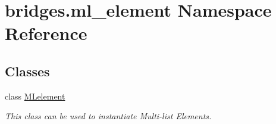 \hypertarget{namespacebridges_1_1ml__element}{}\section{bridges.\+ml\+\_\+element Namespace Reference}
\label{namespacebridges_1_1ml__element}
\subsection*{Classes}
\begin{DoxyCompactItemize}
\item 
class \hyperlink{classbridges_1_1ml__element_1_1_m_lelement}{M\+Lelement}
\begin{DoxyCompactList}\small\item\em This class can be used to instantiate Multi-\/list Elements. \end{DoxyCompactList}\end{DoxyCompactItemize}
